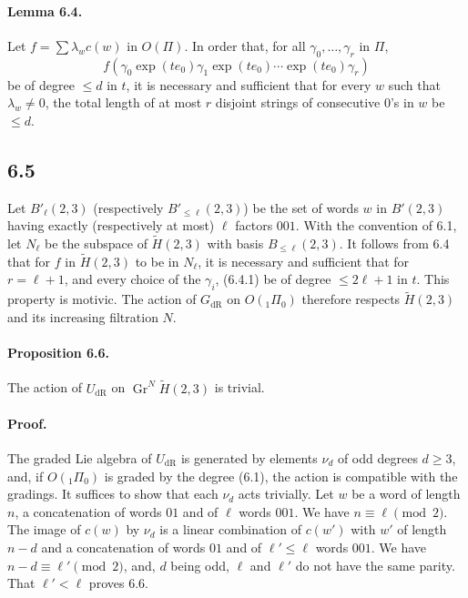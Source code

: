 \documentclass[11pt]{article}
\newcommand{\Gr}{\operatorname{Gr}}
\newcommand{\dR}{\mathrm{dR}}
\begin{document}
\paragraph{Lemma 6.4.}
Let $f=\sum\lambda_w c(w)$ in $O(\Pi)$.
In order that, for all $\gamma_0,\ldots,\gamma_r$ in $\Pi$,
\begin{equation}
 f(\gamma_0\exp(te_0)\gamma_1\exp(te_0)\cdots\exp(te_0)\gamma_r)
\tag{6.4.1}
\end{equation}
be of degree $\leq d$ in $t$, it is necessary and sufficient that for every $w$ such that $\lambda_w\ne0$, the total length of at most $r$ disjoint strings of consecutive $0$'s in $w$ be $\leq d$.

\subsection*{6.5}
Let $B'_\ell(2,3)$ (respectively $B'_{\leq\ell}(2,3)$) be the set of words $w$ in $B'(2,3)$ having exactly (respectively at most) $\ell$ factors $001$.
With the convention of 6.1, let $N_\ell$ be the subspace of $\widetilde H(2,3)$ with basis $B_{\leq\ell}(2,3)$.
It follows from 6.4 that for $f$ in $\widetilde H(2,3)$ to be in $N_\ell$, it is necessary and sufficient that for $r=\ell+1$, and every choice of the $\gamma_i$, (6.4.1) be of degree $\leq2\ell+1$ in $t$.
This property is motivic.
The action of $G_{\dR}$ on $O({}_1\Pi_0)$ therefore respects $\widetilde H(2,3)$ and its increasing filtration $N$.

\paragraph{Proposition 6.6.}
The action of $U_{\dR}$ on $\Gr^N\widetilde H(2,3)$ is trivial.

\paragraph{Proof.}
The graded Lie algebra of $U_{\dR}$ is generated by elements $\nu_d$ of odd degrees $d\geq3$, and, if $O({}_1\Pi_0)$ is graded by the degree (6.1), the action is compatible with the gradings.
It suffices to show that each $\nu_d$ acts trivially.
Let $w$ be a word of length $n$, a concatenation of words $01$ and of $\ell$ words $001$.
We have $n\equiv\ell\pmod 2$.
The image of $c(w)$ by $\nu_d$ is a linear combination of $c(w')$ with $w'$ of length $n-d$ and a concatenation of words $01$ and of $\ell'\leq\ell$ words $001$.
We have $n-d\equiv\ell'\pmod2$, and, $d$ being odd, $\ell$ and $\ell'$ do not have the same parity.
That $\ell'<\ell$ proves 6.6.
\end{document}
